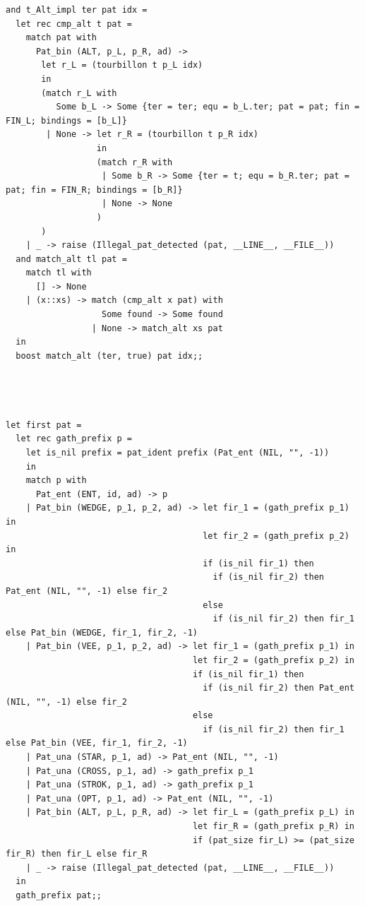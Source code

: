 \documentclass[12pt]{article}
\begin{document}
\begin{tiny}
\begin{verbatim}
and t_Alt_impl ter pat idx =
  let rec cmp_alt t pat =
    match pat with
      Pat_bin (ALT, p_L, p_R, ad) ->
       let r_L = (tourbillon t p_L idx)
       in
       (match r_L with
          Some b_L -> Some {ter = ter; equ = b_L.ter; pat = pat; fin = FIN_L; bindings = [b_L]}
        | None -> let r_R = (tourbillon t p_R idx)
                  in
                  (match r_R with
                   | Some b_R -> Some {ter = t; equ = b_R.ter; pat = pat; fin = FIN_R; bindings = [b_R]}
                   | None -> None
                  )
       )
    | _ -> raise (Illegal_pat_detected (pat, __LINE__, __FILE__))
  and match_alt tl pat =
    match tl with
      [] -> None
    | (x::xs) -> match (cmp_alt x pat) with
                   Some found -> Some found
                 | None -> match_alt xs pat
  in
  boost match_alt (ter, true) pat idx;;




let first pat =
  let rec gath_prefix p =
    let is_nil prefix = pat_ident prefix (Pat_ent (NIL, "", -1))
    in
    match p with
      Pat_ent (ENT, id, ad) -> p
    | Pat_bin (WEDGE, p_1, p_2, ad) -> let fir_1 = (gath_prefix p_1) in
                                       let fir_2 = (gath_prefix p_2) in
                                       if (is_nil fir_1) then
                                         if (is_nil fir_2) then Pat_ent (NIL, "", -1) else fir_2
                                       else
                                         if (is_nil fir_2) then fir_1 else Pat_bin (WEDGE, fir_1, fir_2, -1)
    | Pat_bin (VEE, p_1, p_2, ad) -> let fir_1 = (gath_prefix p_1) in
                                     let fir_2 = (gath_prefix p_2) in
                                     if (is_nil fir_1) then
                                       if (is_nil fir_2) then Pat_ent (NIL, "", -1) else fir_2
                                     else
                                       if (is_nil fir_2) then fir_1 else Pat_bin (VEE, fir_1, fir_2, -1)
    | Pat_una (STAR, p_1, ad) -> Pat_ent (NIL, "", -1)
    | Pat_una (CROSS, p_1, ad) -> gath_prefix p_1
    | Pat_una (STROK, p_1, ad) -> gath_prefix p_1
    | Pat_una (OPT, p_1, ad) -> Pat_ent (NIL, "", -1)
    | Pat_bin (ALT, p_L, p_R, ad) -> let fir_L = (gath_prefix p_L) in
                                     let fir_R = (gath_prefix p_R) in
                                     if (pat_size fir_L) >= (pat_size fir_R) then fir_L else fir_R
    | _ -> raise (Illegal_pat_detected (pat, __LINE__, __FILE__))
  in
  gath_prefix pat;;



\end{verbatim}
\end{tiny}
\end{document}
